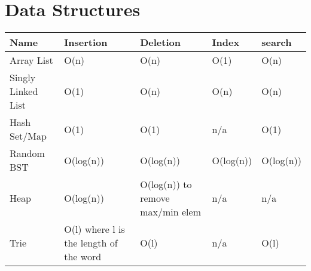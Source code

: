 \section{Data Structures}
\begin{center}
\begin{longtable}{|l|p{3cm}|l|l|l|}
\hline
\textbf{Name} & \textbf{Insertion} & \textbf{Deletion} & \textbf{Index} & \textbf{search} \\
\hline 

Array List & O(n) & O(n) & O(1) & O(n) \\

\hline

Singly Linked List & O(1) & O(n) & O(n) & O(n) \\

\hline

Hash Set/Map & O(1) & O(1) & n/a & O(1) \\

\hline 

Random BST & O(log(n)) & O(log(n)) & O(log(n)) & O(log(n)) \\

\hline 

Heap & O(log(n)) & O(log(n)) to remove max/min elem & n/a & n/a \\

\hline 

Trie & O(l) where l is the length of the word & O(l) & n/a &  O(l) \\

\hline

\end{longtable}
\end{center}